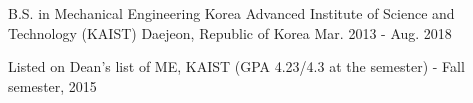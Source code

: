 \begin{cventries}
  \cventry
  {B.S. in Mechanical Engineering} %
  {Korea Advanced Institute of Science and Technology (KAIST)} %
  {Daejeon, Republic of Korea} %
  {Mar. 2013 - Aug. 2018} %
  {
    \begin{cvitems} %
      \item {Listed on Dean’s list of ME, KAIST (GPA 4.23/4.3 at the semester) - Fall semester, 2015}
    \end{cvitems}
  }

\end{cventries}
